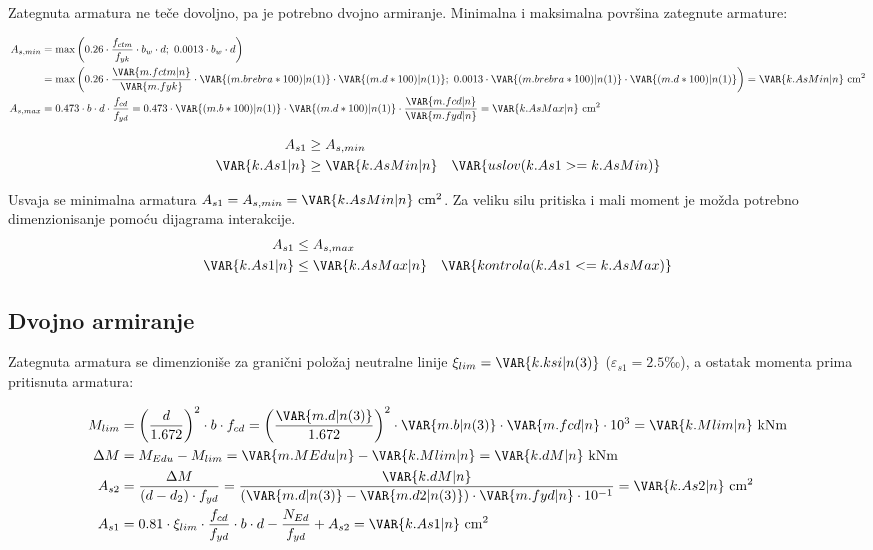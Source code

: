 Zategnuta armatura ne teče dovoljno, pa je potrebno dvojno armiranje.
Minimalna i maksimalna površina zategnute armature:

\begin{align*}
A_{s,min} &= \max\left(0.26 \cdot \frac{f_{ctm}}{f_{yk}} \cdot b_w \cdot d;\ 0.0013 \cdot b_w \cdot d\right) \\
&= \max\left(0.26 \cdot \frac{\VAR{m.fctm|n}}{\VAR{m.fyk}} \cdot \VAR{(m.brebra*100)|n(1)} \cdot \VAR{(m.d*100)|n(1)};\ 0.0013 \cdot \VAR{(m.brebra*100)|n(1)} \cdot \VAR{(m.d*100)|n(1)}\right) = \VAR{k.AsMin|n} \ \mathrm{cm^2} \\
A_{s,max} &= 0.473 \cdot b \cdot d \cdot \frac{f_{cd}}{f_{yd}} = 0.473 \cdot \VAR{(m.b*100)|n(1)} \cdot \VAR{(m.d*100)|n(1)} \cdot \frac{\VAR{m.fcd|n}}{\VAR{m.fyd|n}} = \VAR{k.AsMax|n} \ \mathrm{cm^2}
\end{align*}

\begin{align*}
A_{s1} &\geq A_{s,min} \\
\VAR{k.As1|n} &\geq \VAR{k.AsMin|n} \quad \VAR{uslov(k.As1 >= k.AsMin)}
\end{align*}

Usvaja se minimalna armatura $A_{s1} = A_{s,min} = \VAR{k.AsMin|n} \ \mathrm{cm^2}$. Za veliku silu pritiska i mali moment je možda potrebno dimenzionisanje pomoću dijagrama interakcije.
\begin{align*}
A_{s1} &\leq A_{s,max} \\
\VAR{k.As1|n} &\leq \VAR{k.AsMax|n} \quad \VAR{kontrola(k.As1 <= k.AsMax)}
\end{align*}

\subsection{Dvojno armiranje}

Zategnuta armatura se dimenzioniše za granični položaj neutralne linije $\xi_{lim} = \VAR{k.ksi|n(3)}$ ($\varepsilon_{s1} = 2.5$‰), a ostatak momenta prima pritisnuta armatura:

\begin{align*}
M_{lim} &= \left(\frac{d}{1.672}\right)^2 \cdot b \cdot f_{cd} = \left(\frac{\VAR{m.d|n(3)}}{1.672}\right)^2 \cdot \VAR{m.b|n(3)} \cdot \VAR{m.fcd|n} \cdot 10^3 = \VAR{k.Mlim|n} \ \mathrm{kNm} \\
\Delta M &= M_{Edu} - M_{lim} = \VAR{m.MEdu|n} - \VAR{k.Mlim|n} = \VAR{k.dM|n} \ \mathrm{kNm} \\
A_{s2} &= \frac{\Delta M}{(d - d_2) \cdot f_{yd}} = \frac{\VAR{k.dM|n}}{(\VAR{m.d|n(3)} - \VAR{m.d2|n(3)}) \cdot \VAR{m.fyd|n} \cdot 10^{-1}} = \VAR{k.As2|n} \ \mathrm{cm^2} \\
A_{s1} &= 0.81 \cdot \xi_{lim} \cdot \frac{f_{cd}}{f_{yd}} \cdot b \cdot d - \frac{N_{Ed}}{f_{yd}} + A_{s2} = \VAR{k.As1|n} \ \mathrm{cm^2}
\end{align*}

